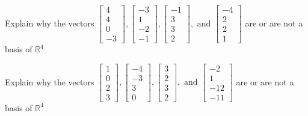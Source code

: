 \documentclass{article}
\begin{document}
\begin{exerciseStatement}
    Explain why the vectors \(\left[\begin{array}{r}
4 \\
4 \\
0 \\
-3
\end{array}\right] , \left[\begin{array}{r}
-3 \\
1 \\
-2 \\
-1
\end{array}\right] , \left[\begin{array}{r}
-1 \\
3 \\
3 \\
2
\end{array}\right] , \text{ and } \left[\begin{array}{r}
-4 \\
2 \\
2 \\
1
\end{array}\right]\) are or are not a basis of \(\mathbb{R}^4\)


  
\end{exerciseStatement}

\begin{exerciseStatement}
    Explain why the vectors \(\left[\begin{array}{r}
1 \\
0 \\
2 \\
3
\end{array}\right] , \left[\begin{array}{r}
-4 \\
-3 \\
3 \\
0
\end{array}\right] , \left[\begin{array}{r}
3 \\
2 \\
3 \\
2
\end{array}\right] , \text{ and } \left[\begin{array}{r}
-2 \\
1 \\
-12 \\
-11
\end{array}\right]\) are or are not a basis of \(\mathbb{R}^4\)


  
\end{exerciseStatement}
\end{document}
